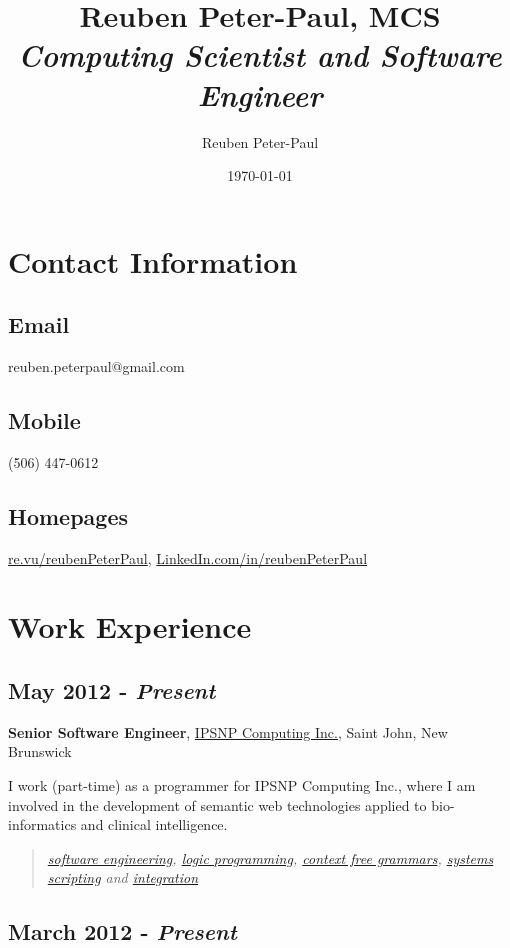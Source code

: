 \documentclass[11pt]{article}
\title{\textbf{Reuben Peter-Paul, MCS}\\\emph{\Large{Computing Scientist and Software Engineer}}}
\author{Reuben Peter-Paul}
\date{\today}
\begin{document}
\maketitle






\section{Contact Information}
\label{sec-1}
\subsection{Email}
\label{sec-1-1}

reuben.peterpaul@gmail.com
\subsection{Mobile}
\label{sec-1-2}

(506) 447-0612
\subsection{Homepages}
\label{sec-1-3}

\href{http://re.vu/reubenPeterPaul}{re.vu/reubenPeterPaul}, \href{http://linkedin.com/in/reubenpeterpaul}{LinkedIn.com/in/reubenPeterPaul}
\section{Work Experience}
\label{sec-2}
\subsection{May 2012 - \emph{Present}}
\label{sec-2-1}

\textbf{Senior Software Engineer}, \href{http://ipsnp.wikidot.com/}{IPSNP Computing Inc.}, Saint John, New Brunswick

I work (part-time) as a programmer for IPSNP Computing Inc., where I am involved in
the development of semantic web technologies applied to bio-informatics and
clinical intelligence.
\begin{quote}
\emph{\hyperref[sec-5-2]{software engineering}, \hyperref[sec-5-1]{logic programming}, \hyperref[sec-5-4]{context free grammars}, \hyperref[systems-scripting]{systems scripting} and \hyperref[sec-5-2]{integration}}
\end{quote}
\subsection{March 2012 - \emph{Present}}
\label{sec-2-2}
\end{document}
